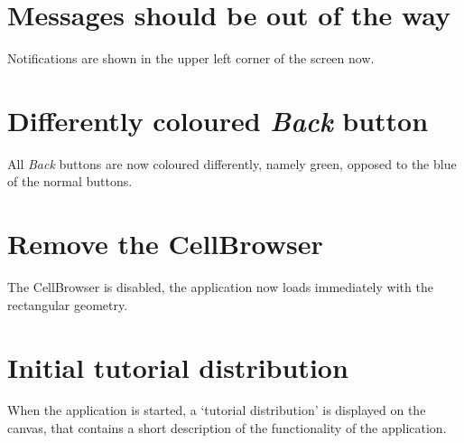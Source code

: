 \section*{Messages should be out of the way}
Notifications are shown in the upper left corner of the screen now.

\section*{Differently coloured \emph{Back} button}
All \emph{Back} buttons are now coloured differently, namely green, opposed to the blue of the normal buttons.

\section*{Remove the CellBrowser}
The CellBrowser is disabled, the application now loads immediately with the rectangular geometry.

\section*{Initial tutorial distribution}
When the application is started, a `tutorial distribution' is displayed on the canvas, that contains a short description of the functionality of the application.